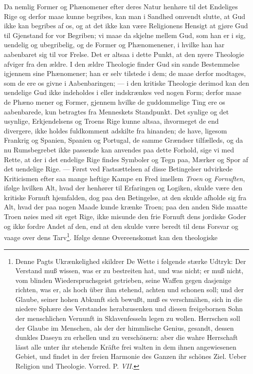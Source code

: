 \documentclass[12pt]{book}
\newcommand{\opage}[1]{\marginnote{\footnotesize\textit{[#1]}}}
\begin{document}
Da nemlig Former og Phænomener efter deres Natur henhøre til det Endeliges
Rige og derfor maae kunne begribes, kan man i Sandhed omvendt slutte, at Gud
ikke kan begribes af os, og at det ikke kan være Religionens Hensigt at gjøre
Gud til Gjenstand for vor Begriben; vi maae da skjelne mellem Gud, som han er
i sig, uendelig og ubegribelig, og de Former og Phænomenener, i hvilke han har
aabenbaret sig til vor Frelse. Det er altsaa i dette Punkt, at den nyere
Theologie afviger fra den ældre. I den ældre Theologie finder Gud sin sande
Bestemmelse igjennem sine Phænomener; han er selv tilstede i dem; de maae
derfor modtages, som de ere os givne i Aabenbaringen; --- i den kritiske
Theologie derimod kan den uendelige Gud ikke indeholdes i eller indskrænkes
ved nogen Form; derfor maae de Phæno\-%
\opage{99}\setcounter{footnote}{0}%
mener og Former, gjennem hvilke de guddommelige Ting ere os aabenbarede, kun
betragtes fra Menneskets Standpunkt. Det synlige og det usynlige,
Erkjendelsens og Troens Rige kunne altsaa, ihvormeget de end divergere, ikke
holdes fuldkomment adskilte fra hinanden; de have, ligesom Frankrig og
Spanien, Spanien og Portugal, de samme Grændser tilfælleds, og da nu
Rumsbegrebet ikke passende kan anvendes paa dette Forhold, sige vi med Rette,
at der i det endelige Rige findes Symboler og Tegn paa, Mærker og Spor af det
uendelige Rige. --- Først ved Fastsættelsen af disse Betingelser udvirkede
Kriticismen efter saa mange heftige Kampe en Fred imellem \emph{Troen} og
\emph{Fornuften}, ifølge hvilken Alt, hvad der henhører til Erfaringen og
Logiken, skulde være den kritiske Fornuft hjemfalden, dog paa den Betingelse,
at den skulde afholde sig fra Alt, hvad der paa nogen Maade kunde krænke
Troen; paa den anden Side maatte Troen nøies med sit eget Rige, ikke misunde
den frie Fornuft dens jordiske Goder og ikke fordre Andet af den, end at den
skulde være beredt til dens Forsvar og vaage over dens Tarv\footnote{Denne
Pagts Ukrænkelighed skildrer De Wette i følgende stærke Udtryk: Der Verstand
muß wissen, was er zu bestreiten hat, und was nicht; er muß nicht, vom blinden
Wiederspruchsgeist getrieben, seine Waffen gegen dasjenige richten, was er,
als hoch über ihm stehend, achten und schonen soll; und der Glaube, seiner
hohen Abkunft sich bewußt, muß es verschmähen, sich in die niedere Sphære des
Verstandes herabzusenken und diesen freigebornen Sohn der menschlichen
Vernunft in Sklavenfesseln legen zu wollen. Herrschen soll der Glaube im
Menschen, als der der himmlische Genius, gesandt, dessen dunkles Daseyn zu
erhellen und zu verschönern: aber die wahre Herrschaft lässt alle unter ihr
stehende Kräfte frei walten in dem ihnen angewiesenen Gebiet, und findet in
der freien Harmonie des Ganzen ihr schönes Ziel. Ueber Religion und Theologie.
Vorred. P. \textit{VII.}}. Ifølge denne Overeenskomst kan den theologiske
\end{document}
